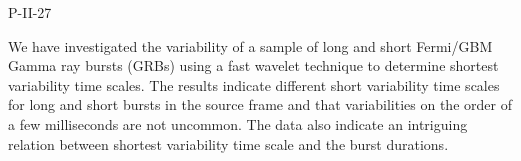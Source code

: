P-II-27


\bigskip



\bigskip

\noindent We have investigated the variability of a sample of long and short Fermi/GBM Gamma ray bursts (GRBs) using a fast wavelet technique to determine shortest variability time scales. The results indicate different short variability time scales for long and short bursts in the source frame and that variabilities on the order of a few milliseconds are not uncommon. The data also indicate an intriguing relation between shortest variability time scale and the burst durations.
